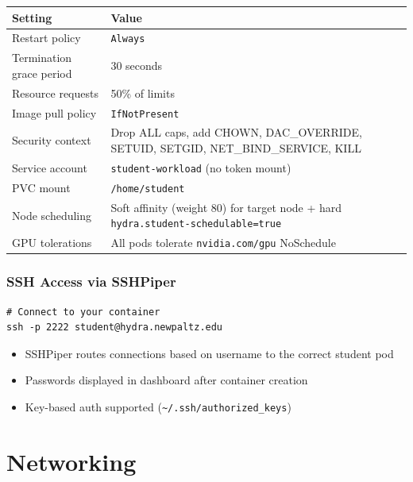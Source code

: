 \documentclass[11pt,a4paper]{article}
\begin{document}
\begin{table}[H]
\centering
\begin{tabular}{ll}
\toprule
\textbf{Setting} & \textbf{Value} \\
\midrule
Restart policy & \texttt{Always} \\
Termination grace period & 30 seconds \\
Resource requests & 50\% of limits \\
Image pull policy & \texttt{IfNotPresent} \\
Security context & Drop ALL caps, add CHOWN, DAC\_OVERRIDE, SETUID, SETGID, NET\_BIND\_SERVICE, KILL \\
Service account & \texttt{student-workload} (no token mount) \\
PVC mount & \texttt{/home/student} \\
Node scheduling & Soft affinity (weight 80) for target node + hard \texttt{hydra.student-schedulable=true} \\
GPU tolerations & All pods tolerate \texttt{nvidia.com/gpu} NoSchedule \\
\bottomrule
\end{tabular}
\end{table}

\section{SSH Access via SSHPiper}

\begin{lstlisting}[style=bash]
# Connect to your container
ssh -p 2222 student@hydra.newpaltz.edu
\end{lstlisting}

\begin{itemize}[nosep]
    \item SSHPiper routes connections based on username to the correct student pod
    \item Passwords displayed in dashboard after container creation
    \item Key-based auth supported (\texttt{\~{}/.ssh/authorized\_keys})
\end{itemize}

\newpage
\part{Networking}
\end{document}
